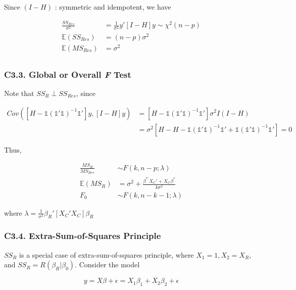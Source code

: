 \documentclass[12pt]{article}
\begin{document}
Since $(I - H)$ : symmetric and idempotent, we have

$$
\begin{aligned}
\frac{SS_{Res}}{\sigma^2} &= \frac{1}{\sigma^2} y' [I - H] y \sim \chi^2 (n-p) \\[8pt]
\mathbb{E} (SS_{Res}) &= (n-p) \sigma^2 \\[8pt]
\mathbb{E} (MS_{Res}) &= \sigma^2 \\[8pt]
\end{aligned}
$$



\subsubsection*{C3.3. Global or Overall \textit{F} Test}


Note that  $SS_{R} \perp SS_{Res}$, since

$$
\begin{aligned}
Cov \left([H - \mathds{1} (\mathds{1}' \mathds{1})^{-1} \mathds{1}' ] y, [I-H] y\right) &= [H - \mathds{1} (\mathds{1}' \mathds{1})^{-1} \mathds{1}' ] \sigma^2 I (I-H) \\[8pt]
&= \sigma^2 [H - H - \mathds{1} (\mathds{1}' \mathds{1})^{-1} \mathds{1}' + \mathds{1} (\mathds{1}' \mathds{1})^{-1} \mathds{1}'] = 0
\end{aligned}
$$

Thus,

$$
\begin{aligned}
\frac{MS_R}{MS_{Res}} &\sim F(k, n-p; \lambda) \\[8pt]
\mathbb{E} (MS_R) &= \sigma^2 + \frac{\beta^{\ast\prime} X_C' + X_C \beta^\ast }{k \sigma^2} \\[10pt]
F_0 &\sim F(k, n-k-1; \lambda)
\end{aligned}
$$

where $\lambda = \frac{1}{\sigma^2}\beta_R' [X_C' X_C] \beta_R $



\subsubsection*{C3.4. Extra-Sum-of-Squares Principle}

$SS_R$ is a special case of extra-sum-of-squares principle, where $X_1 =1, X_2 = X_R$, and $SS_R = R(\beta_R | \beta_0)$. Consider the model

$$
y = X\beta + \epsilon = X_1 \beta_1 + X_2 \beta_2 + \epsilon
$$
\end{document}

